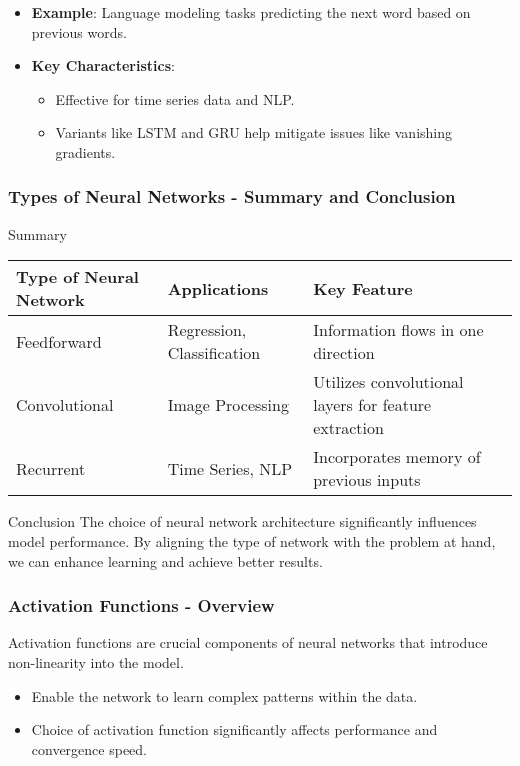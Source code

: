 \documentclass[aspectratio=169]{beamer}
\begin{document}
\begin{frame}[fragile]
\begin{itemize}
        \item \textbf{Example}: Language modeling tasks predicting the next word based on previous words.
        
        \item \textbf{Key Characteristics}:
        \begin{itemize}
            \item Effective for time series data and NLP.
            \item Variants like LSTM and GRU help mitigate issues like vanishing gradients.
        \end{itemize}
    \end{itemize}
\end{frame}

\begin{frame}[fragile]
    \frametitle{Types of Neural Networks - Summary and Conclusion}
    \begin{block}{Summary}
        \begin{tabular}{|l|l|l|}
            \hline
            Type of Neural Network & Applications & Key Feature \\
            \hline
            Feedforward & Regression, Classification & Information flows in one direction \\
            \hline
            Convolutional & Image Processing & Utilizes convolutional layers for feature extraction \\
            \hline
            Recurrent & Time Series, NLP & Incorporates memory of previous inputs \\
            \hline
        \end{tabular}
    \end{block}
    
    \begin{block}{Conclusion}
        The choice of neural network architecture significantly influences model performance. By aligning the type of network with the problem at hand, we can enhance learning and achieve better results.
    \end{block}
\end{frame}

\begin{frame}[fragile]
    \frametitle{Activation Functions - Overview}
    Activation functions are crucial components of neural networks that introduce non-linearity into the model.
    \begin{itemize}
        \item Enable the network to learn complex patterns within the data.
        \item Choice of activation function significantly affects performance and convergence speed.
    \end{itemize}
\end{frame}
\end{document}
